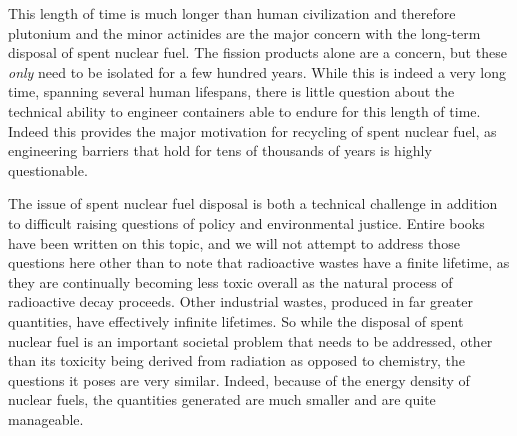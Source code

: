This length of time is much longer than human civilization and therefore plutonium and the minor actinides are the major concern with the long-term disposal of spent nuclear fuel. The fission products alone are a concern, but these \emph{only} need to be isolated for a few hundred years. While this is indeed a very long time, spanning several human lifespans, there is little question about the technical ability to engineer containers able to endure for this length of time. Indeed this provides the major motivation for recycling of spent nuclear fuel, as engineering barriers that hold for tens of thousands of years is highly questionable.

The issue of spent nuclear fuel disposal is both a technical challenge in addition to difficult raising questions of policy and environmental justice. Entire books have been written on this topic, and we will not attempt to address those questions here other than to note that radioactive wastes have a finite lifetime, as they are continually becoming less toxic overall as the natural process of radioactive decay proceeds. Other industrial wastes, produced in far greater quantities, have effectively infinite lifetimes. So while the disposal of spent nuclear fuel is an important societal problem that needs to be addressed, other than its toxicity being derived from radiation as opposed to chemistry, the questions it poses are very similar. Indeed, because of the energy density of nuclear fuels, the quantities generated are much smaller and are quite manageable.


